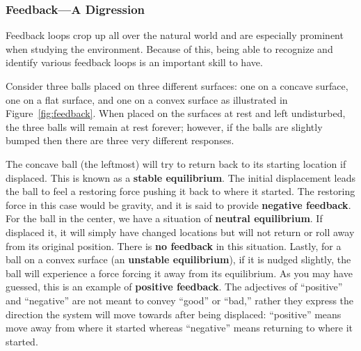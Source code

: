     \subsubsection{Feedback---A Digression} %
    \label{ssub:feedback}
    Feedback loops crop up all over the natural world and are especially prominent when studying the environment. Because of this, being able to recognize and identify various feedback loops is an important skill to have.
    
    Consider three balls placed on three different surfaces: one on a concave surface, one on a flat surface, and one on a convex surface as illustrated in Figure~\ref{fig:feedback}. When placed on the surfaces at rest and left undisturbed, the three balls will remain at rest forever; however, if the balls are slightly bumped then there are three very different responses. 

    The concave ball (the leftmost) will try to return back to its starting location if displaced. This is known as a \textbf{stable equilibrium}. The initial displacement leads the ball to feel a restoring force pushing it back to where it started. The restoring force in this case would be gravity, and it is said to provide \textbf{negative feedback}. For the ball in the center, we have a situation of \textbf{neutral equilibrium}. If displaced it, it will simply have changed locations but will not return or roll away from its original position. There is \textbf{no feedback} in this situation. Lastly, for a ball on a convex surface (an \textbf{unstable equilibrium}), if it is nudged slightly, the ball will experience a force forcing it away from its equilibrium. As you may have guessed, this is an example of \textbf{positive feedback}. The adjectives of ``positive'' and ``negative'' are not meant to convey ``good'' or ``bad,'' rather they express the direction the system will move towards after being displaced: ``positive'' means move away from where it started whereas ``negative'' means returning to where it started.

